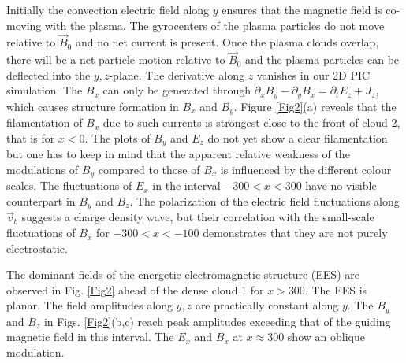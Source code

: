 \documentclass[structabstract]{aa}
\begin{document}
Initially the convection electric field along $y$ ensures that the magnetic 
field is co-moving with the plasma. The gyrocenters of the plasma particles 
do not move relative to $\vec{B}_0$ and no net current is present. Once the 
plasma clouds overlap, there will be a net particle motion relative to 
$\vec{B}_0$ and the plasma particles can be deflected into the $y,z$-plane.
The derivative along $z$ vanishes in our 2D PIC simulation. The $B_x$ can 
only be generated through $\partial_x B_y - \partial_y B_x = \partial_t E_z 
+ J_z$, which causes structure formation in $B_x$ and $B_y$. Figure 
\ref{Fig2}(a) reveals that the filamentation of $B_x$ due to such currents 
is strongest close to the front of cloud 2, that is for $x<0$. The plots of 
$B_y$ and $E_z$ do not yet show a clear filamentation but one has to 
keep in mind that the apparent relative weakness of the modulations of $B_y$ 
compared to those of $B_x$ is influenced by the different colour scales. 
The fluctuations of $E_x$ in the interval $-300 < x < 300$ have no visible 
counterpart in $B_y$ and $B_z$. The polarization of the electric field
fluctuations along $\vec{v}_b$ suggests a charge density wave, but their 
correlation with the small-scale fluctuations of $B_x$ for $-300 < x < -100$ 
demonstrates that they are not purely electrostatic. 

The dominant fields of the energetic electromagnetic structure (EES) are 
observed in Fig. \ref{Fig2} ahead of the dense cloud 1 for $x>300$. The 
EES is planar. The field amplitudes along $y,z$ are practically constant 
along $y$. The $B_y$ and $B_z$ in Figs. \ref{Fig2}(b,c) reach peak 
amplitudes exceeding that of the guiding magnetic field in this interval. 
The $E_x$ and $B_x$ at $x\approx 300$ show an oblique modulation.
\end{document}
